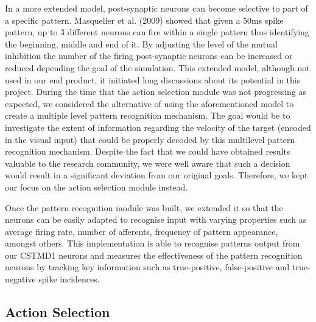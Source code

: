 \documentclass[a4paper,11pt]{article}
\begin{document}
	
	In a more extended model, post-synaptic neurons can become selective to part of a specific pattern. Masquelier et al. (2009) showed that given a 50ms spike pattern, up to 3 different neurons can fire within a single pattern thus identifying the beginning, middle and end of it. By adjusting the level of the mutual inhibition the number of the firing post-synaptic neurons can be increased or reduced depending the goal of the simulation. This extended model, although not used in our end product, it initiated long discussions about its potential in this project. During the time that the action selection module was not progressing as expected, we considered the alternative of using the aforementioned model to create a multiple level pattern recognition mechanism. The goal would be to investigate the extent of information regarding the velocity of the target (encoded in the visual input) that could be properly decoded by this multilevel pattern recognition mechanism. Despite the fact that we could have obtained results valuable to the research community, we were well aware that such a decision would result in a significant deviation from our original goals. Therefore, we kept our focus on the action selection module instead.\par

	Once the pattern recognition module was built, we extended it so that the neurons can be easily adapted to recognise input with varying properties such as average firing rate, number of afferents, frequency of pattern appearance, amongst others. This implementation is able to recognise patterns output from our CSTMD1 neurons and measures the effectiveness of the pattern recognition neurons by tracking key information such as true-positive, false-positive and true-negative spike incidences.

\subsection{Action Selection}
\end{document}
